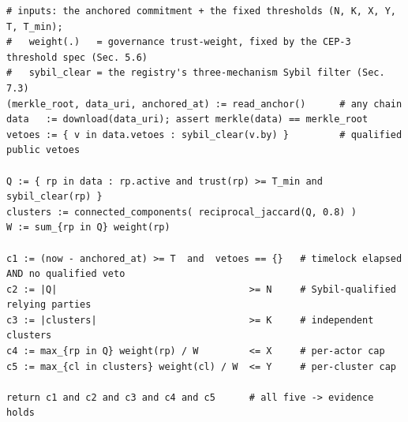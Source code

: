 \begin{lstlisting}[basicstyle=\ttfamily\footnotesize,breaklines=true,frame=single,
                   framesep=4pt,xleftmargin=2pt,mathescape=true]
# inputs: the anchored commitment + the fixed thresholds (N, K, X, Y, T, T_min);
#   weight(.)   = governance trust-weight, fixed by the CEP-3 threshold spec (Sec. 5.6)
#   sybil_clear = the registry's three-mechanism Sybil filter (Sec. 7.3)
(merkle_root, data_uri, anchored_at) := read_anchor()      # any chain
data   := download(data_uri); assert merkle(data) == merkle_root
vetoes := { v in data.vetoes : sybil_clear(v.by) }         # qualified public vetoes

Q := { rp in data : rp.active and trust(rp) >= T_min and sybil_clear(rp) }
clusters := connected_components( reciprocal_jaccard(Q, 0.8) )
W := sum_{rp in Q} weight(rp)

c1 := (now - anchored_at) >= T  and  vetoes == {}   # timelock elapsed AND no qualified veto
c2 := |Q|                                  >= N     # Sybil-qualified relying parties
c3 := |clusters|                           >= K     # independent clusters
c4 := max_{rp in Q} weight(rp) / W         <= X     # per-actor cap
c5 := max_{cl in clusters} weight(cl) / W  <= Y     # per-cluster cap

return c1 and c2 and c3 and c4 and c5      # all five -> evidence holds
\end{lstlisting}
